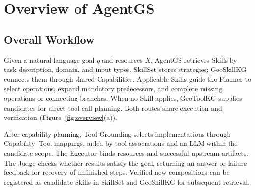 \section{Overview of AgentGS}
\label{sec:method}
\subsection{Overall Workflow}
Given a natural-language goal $q$ and resources $X$, AgentGS retrieves Skills by task description, domain, and input types. SkillSet stores strategies; GeoSkillKG connects them through shared Capabilities. Applicable Skills guide the Planner to select operations, expand mandatory predecessors, and complete missing operations or connecting branches. When no Skill applies, GeoToolKG supplies candidates for direct tool-call planning. Both routes share execution and verification (Figure~\ref{fig:overview}(a)).

After capability planning, Tool Grounding selects implementations through Capability--Tool mappings, aided by tool associations and an LLM within the candidate scope. The Executor binds resources and successful upstream artifacts. The Judge checks whether results satisfy the goal, returning an answer or failure feedback for recovery of unfinished steps. Verified new compositions can be registered as candidate Skills in SkillSet and GeoSkillKG for subsequent retrieval.



